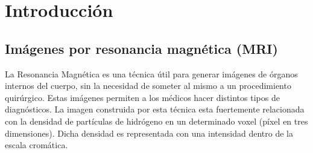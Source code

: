 \documentclass[11pt,a4paper,twoside]{tesis}
\begin{document}
\def\titulo{Licenciado }

\def\autor{Leonel Exequiel G\'omez}
\def\tituloTesis{La Guerra de las Galaxias: \mbox{Rebelión e Imperio}}
\def\runtitulo{La Guerra de las Galaxias: Rebelión e Imperio}
\def\runtitle{Star Wars: Rebellion and Empire}
\def\director{Obi-Wan Kenobi}
\def\codirector{Master Yoda}
\def\lugar{Buenos Aires, 2011}


\frontmatter
\pagestyle{empty}


\cleardoublepage


\cleardoublepage

\cleardoublepage

\cleardoublepage
\tableofcontents

\mainmatter
\pagestyle{headings}



\chapter{Introducci\'on}
\section{Imágenes por resonancia magnética (MRI)}




La Resonancia Magn\'etica es una t\'ecnica útil para generar im\'agenes de 
\'organos internos del cuerpo, sin la necesidad de someter al mismo a un 
procedimiento quir\'urgico. Estas im\'agenes permiten a los m\'edicos hacer distintos tipos de 
diagn\'osticos. La imagen construida por esta t\'ecnica esta fuertemente 
relacionada con la densidad de part\'iculas de hidr\'ogeno en un determinado 
voxel (p\'ixel en tres dimensiones). Dicha densidad es representada 
con una intensidad dentro de la escala crom\'atica.
\end{document}
